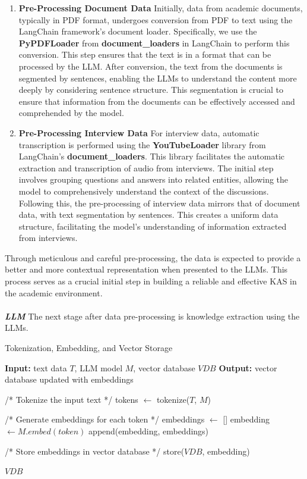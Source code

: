 \documentclass[runningheads]{llncs}
\begin{document}
\begin{enumerate}
    \item \textbf{Pre-Processing Document Data}
    Initially, data from academic documents, typically in PDF format, undergoes conversion from PDF to text using the LangChain framework's document loader. Specifically, we use the \textbf{PyPDFLoader} from \textbf{document\_loaders} in LangChain to perform this conversion. This step ensures that the text is in a format that can be processed by the LLM. After conversion, the text from the documents is segmented by sentences, enabling the LLMs to understand the content more deeply by considering sentence structure. This segmentation is crucial to ensure that information from the documents can be effectively accessed and comprehended by the model.
    
    \item \textbf{Pre-Processing Interview Data} For interview data, automatic transcription is performed using the \textbf{YouTubeLoader} library from LangChain's  \textbf{document\_loaders}. This library facilitates the automatic extraction and transcription of audio from interviews. The initial step involves grouping questions and answers into related entities, allowing the model to comprehensively understand the context of the discussions. Following this, the pre-processing of interview data mirrors that of document data, with text segmentation by sentences. This creates a uniform data structure, facilitating the model's understanding of information extracted from interviews.
\end{enumerate}

Through meticulous and careful pre-processing, the data is expected to provide a better and more contextual representation when presented to the LLMs. This process serves as a crucial initial step in building a reliable and effective KAS in the academic environment. \\
\\
\textbf{\textit{LLM}} The next stage after data pre-processing is knowledge extraction using the LLMs.

\begin{algorithm}
    \caption{Tokenization, Embedding, and Vector Storage}
    \begin{algorithmic}[1]
    \State \textbf{Input:} text data $T$, LLM model $M$, vector database $VDB$
    \State \textbf{Output:} vector database updated with embeddings
    
    \State /* Tokenize the input text */
    \State tokens $\gets$ tokenize($T$, $M$)
    
    \State /* Generate embeddings for each token */
    \State embeddings $\gets$ []
        \State embedding $\gets M.embed(token)$
        \State append(embedding, embeddings)
    \EndFor
    
    \State /* Store embeddings in vector database */
        \State store($VDB$, embedding)
    \EndFor
    
    \State \Return $VDB$
    \end{algorithmic}
\end{algorithm}
\end{document}
